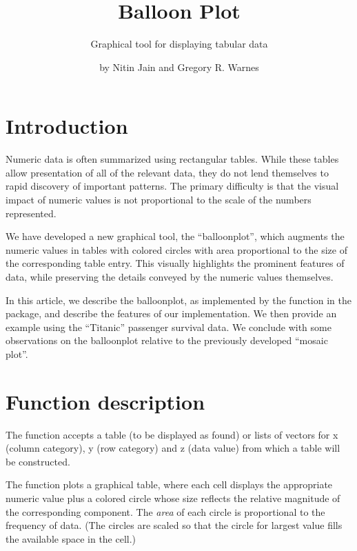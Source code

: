 \documentclass[a4paper]{report}
\begin{document}
\begin{article}
\author{by Nitin Jain and Gregory R. Warnes}
\title{Balloon Plot}
\subtitle{Graphical tool for displaying tabular data}

\maketitle

\section*{Introduction}

Numeric data is often summarized using rectangular tables. While
these tables allow presentation of all of the relevant data, they do
not lend themselves to rapid discovery of important patterns. The
primary difficulty is that the visual impact of numeric values is
not proportional to the scale of the numbers represented.

We have developed a new graphical tool, the ``balloonplot'',
which augments the numeric values in tables with colored circles
with area proportional to the size of the corresponding table
entry. This visually highlights the prominent features of
data, while preserving the details conveyed by the numeric values
themselves.

In this article, we describe the balloonplot, as implemented by the
 function in the  package, and
describe the features of our implementation.  We then provide an
example using the ``Titanic'' passenger survival data.  We conclude
with some observations on the balloonplot relative to the
previously developed ``mosaic plot''.

\section*{Function description}

The  function accepts a table (to be displayed as
found) or lists of vectors for x (column category), y (row category)
and z (data value) from which a table will be constructed.

The  function plots a graphical table,
where each cell displays the appropriate numeric value plus a
colored circle whose size reflects the relative magnitude of the
corresponding component. The
\emph{area} of each circle is proportional to the frequency of
data. (The circles are scaled so that the circle for largest value
fills the available space in the cell.)



\end{article}
\end{document}

